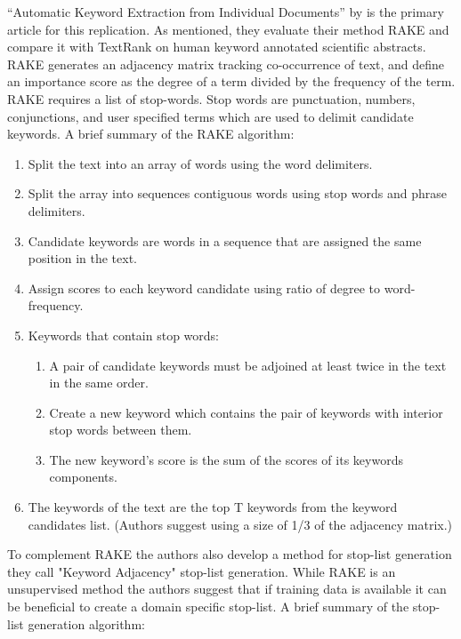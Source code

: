 \documentclass[11pt,a4paper]{article}
\begin{document}
“Automatic Keyword Extraction from Individual Documents” by \citet{1} is the primary article for this replication. As mentioned, they evaluate their method RAKE and compare it with TextRank on human keyword annotated scientific abstracts. RAKE generates an adjacency matrix tracking co-occurrence of text, and define an importance score as the degree of a term divided by the frequency of the term. RAKE requires a list of stop-words. Stop words are punctuation, numbers, conjunctions, and user specified terms which are used to delimit candidate keywords. A brief summary of the RAKE algorithm:

\begin{enumerate}
	\small \itemsep0em 

	\item Split the text into an array of words using the word delimiters.
	\item Split the array into sequences contiguous words using stop words and phrase delimiters.
	\item Candidate keywords are words in a sequence that are assigned the same position in the text. 
	\item Assign scores to each keyword candidate using ratio of degree to word-frequency. 
	\item Keywords that contain stop words:
	\begin{enumerate}
		\item A pair of candidate keywords must be adjoined at least twice in the text in the same order.
		\item Create a new keyword which contains the pair of keywords with interior stop words between them.
		\item The new keyword’s score is the sum of the scores of its keywords components.
	\end{enumerate}
	\item The keywords of the text are the top T keywords from the keyword candidates list. (Authors suggest using a size of 1/3 of the adjacency matrix.)

	\normalsize
\end{enumerate}

To complement RAKE the authors also develop a method for stop-list generation they call "Keyword Adjacency" stop-list generation. While RAKE is an unsupervised method the authors suggest that if training data is available it can be beneficial to create a domain specific stop-list.  A brief summary of the stop-list generation algorithm:
\end{document}
